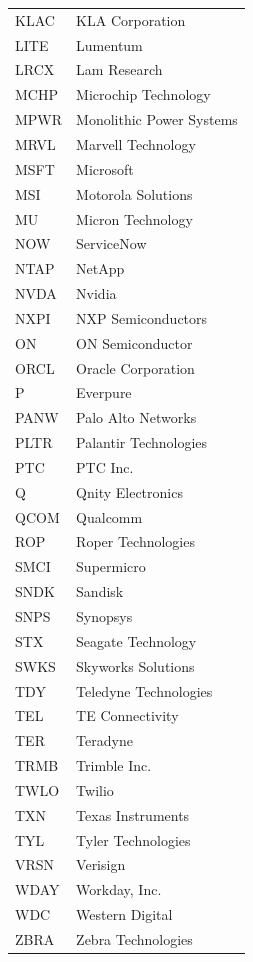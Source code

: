 \documentclass[11pt,a4paper]{article}
\begin{document}
{\begin{longtable}{lp{11cm}}
KLAC & KLA Corporation \\
LITE & Lumentum \\
LRCX & Lam Research \\
MCHP & Microchip Technology \\
MPWR & Monolithic Power Systems \\
MRVL & Marvell Technology \\
MSFT & Microsoft \\
MSI & Motorola Solutions \\
MU & Micron Technology \\
NOW & ServiceNow \\
NTAP & NetApp \\
NVDA & Nvidia \\
NXPI & NXP Semiconductors \\
ON & ON Semiconductor \\
ORCL & Oracle Corporation \\
P & Everpure \\
PANW & Palo Alto Networks \\
PLTR & Palantir Technologies \\
PTC & PTC Inc. \\
Q & Qnity Electronics \\
QCOM & Qualcomm \\
ROP & Roper Technologies \\
SMCI & Supermicro \\
SNDK & Sandisk \\
SNPS & Synopsys \\
STX & Seagate Technology \\
SWKS & Skyworks Solutions \\
TDY & Teledyne Technologies \\
TEL & TE Connectivity \\
TER & Teradyne \\
TRMB & Trimble Inc. \\
TWLO & Twilio \\
TXN & Texas Instruments \\
TYL & Tyler Technologies \\
VRSN & Verisign \\
WDAY & Workday, Inc. \\
WDC & Western Digital \\
ZBRA & Zebra Technologies \\
\hline
\end{longtable}}
\end{document}
